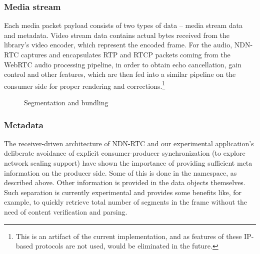 \documentclass{icn/sig-alternate-2012} %
\newcommand{\ndnrtcName}{NDN-RTC} %
\begin{document}
\subsubsection{Media stream}
Each media packet payload consists of two types of data -- media stream data and metadata. Video stream data contains actual bytes received from the library's video encoder, which represent the encoded frame. For the audio, \ndnrtcName{} captures and encapsulates RTP and RTCP packets coming from the WebRTC audio processing pipeline, in order to obtain echo cancellation, gain control and other features, which are then fed into a similar pipeline on the consumer side for proper rendering and corrections.\footnote{This is an artifact of the current implementation, and as features of these IP-based protocols are not used, would be eliminated in the future.}


\begin{figure}[t!]
\centering
{}
\caption{Segmentation and bundling}
\end{figure}

\subsubsection{Metadata}

The receiver-driven architecture of \ndnrtcName{} and our experimental application's deliberate avoidance of explicit consumer-producer synchronization (to explore network scaling support) have shown the importance of providing sufficient meta information on the producer side. Some of this is done in the namespace, as described above.  Other information is provided in the data objects themselves. Such separation is currently experimental and provides some benefits like, for example, to quickly retrieve total number of segments in the frame without the need of content verification and parsing.
\end{document}
